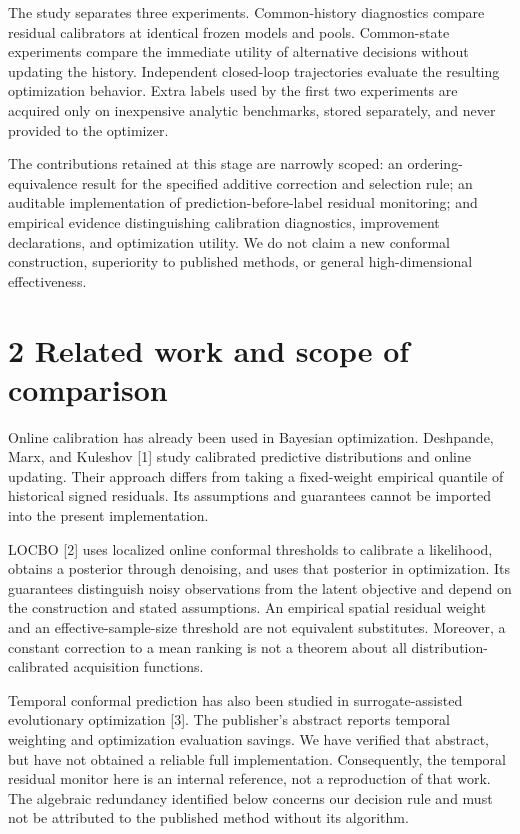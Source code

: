 \documentclass[11pt,a4paper]{article}
\begin{document}
The study separates three experiments. Common-history diagnostics
compare residual calibrators at identical frozen models and pools.
Common-state experiments compare the immediate utility of alternative
decisions without updating the history. Independent closed-loop
trajectories evaluate the resulting optimization behavior. Extra labels
used by the first two experiments are acquired only on inexpensive
analytic benchmarks, stored separately, and never provided to the
optimizer.

The contributions retained at this stage are narrowly scoped: an
ordering-equivalence result for the specified additive correction and
selection rule; an auditable implementation of prediction-before-label
residual monitoring; and empirical evidence distinguishing calibration
diagnostics, improvement declarations, and optimization utility. We do
not claim a new conformal construction, superiority to published
methods, or general high-dimensional effectiveness.

\hypertarget{related-work-and-scope-of-comparison}{%
\section{2 Related work and scope of
comparison}\label{related-work-and-scope-of-comparison}}

Online calibration has already been used in Bayesian optimization.
Deshpande, Marx, and Kuleshov {[}1{]} study calibrated predictive
distributions and online updating. Their approach differs from taking a
fixed-weight empirical quantile of historical signed residuals. Its
assumptions and guarantees cannot be imported into the present
implementation.

LOCBO {[}2{]} uses localized online conformal thresholds to calibrate a
likelihood, obtains a posterior through denoising, and uses that
posterior in optimization. Its guarantees distinguish noisy observations
from the latent objective and depend on the construction and stated
assumptions. An empirical spatial residual weight and an
effective-sample-size threshold are not equivalent substitutes.
Moreover, a constant correction to a mean ranking is not a theorem about
all distribution-calibrated acquisition functions.

Temporal conformal prediction has also been studied in
surrogate-assisted evolutionary optimization {[}3{]}. The publisher's
abstract reports temporal weighting and optimization evaluation savings.
We have verified that abstract, but have not obtained a reliable full
implementation. Consequently, the temporal residual monitor here is an
internal reference, not a reproduction of that work. The algebraic
redundancy identified below concerns our decision rule and must not be
attributed to the published method without its algorithm.
\end{document}
